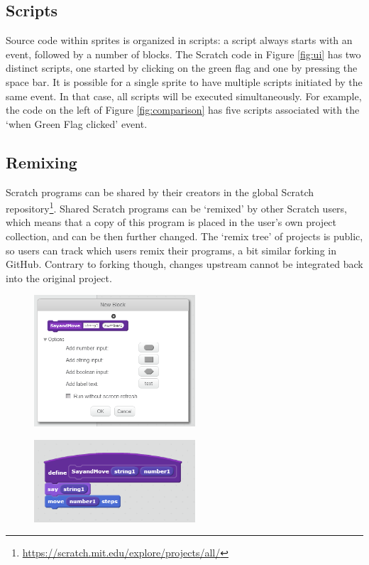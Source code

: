 \documentclass[times,10pt,twocolumn]{article}
\begin{document}
\subsection{Scripts}
Source code within sprites is organized in scripts: a script always starts with an event, followed by a number of blocks. The Scratch code in Figure \ref{fig:ui} has two distinct scripts, one started by clicking on the green flag and one by pressing the space bar. It is possible for a single sprite to have multiple scripts initiated by the same event. In that case, all scripts will be executed simultaneously. For example, the code on the left of Figure \ref{fig:comparison} has five scripts associated with the `when Green Flag clicked' event.

\subsection{Remixing}
Scratch programs can be shared by their creators in the global Scratch repository\footnote{\url{https://scratch.mit.edu/explore/projects/all/}}. Shared Scratch programs can be `remixed' by other Scratch users, which means that a copy of this program is placed in the user's own project collection, and can be then further changed. The `remix tree' of projects is public, so users can track which users remix their programs, a bit similar forking in GitHub. Contrary to forking though, changes upstream cannot be integrated back into the original project.


\begin{figure}
  \begin{center}
  \includegraphics[width=6cm]{fig/makeBlockSmall.png}
  \caption{}
  \label{fig:makeBlock}
  \end{center}
\end{figure} 

\begin{figure}
  \begin{center}
  \includegraphics[width=6cm]{fig/useBlockSmall.png}
  \caption{}
  \label{fig:useBlock}
  \end{center}
\end{figure} 
\end{document}

